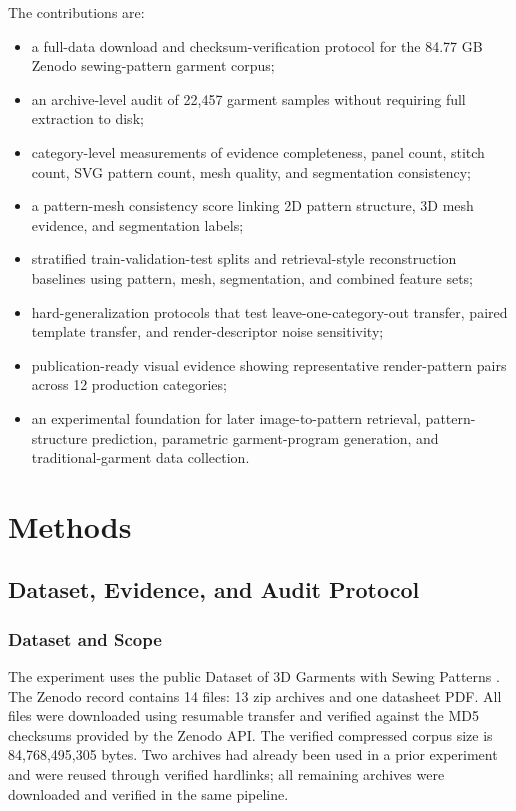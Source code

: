 \documentclass[pdflatex,sn-mathphys-num]{sn-jnl}
\begin{document}
The contributions are:
\begin{itemize}
\item a full-data download and checksum-verification protocol for the 84.77 GB Zenodo sewing-pattern garment corpus;
\item an archive-level audit of 22,457 garment samples without requiring full extraction to disk;
\item category-level measurements of evidence completeness, panel count, stitch count, SVG pattern count, mesh quality, and segmentation consistency;
\item a pattern-mesh consistency score linking 2D pattern structure, 3D mesh evidence, and segmentation labels;
\item stratified train-validation-test splits and retrieval-style reconstruction baselines using pattern, mesh, segmentation, and combined feature sets;
\item hard-generalization protocols that test leave-one-category-out transfer, paired template transfer, and render-descriptor noise sensitivity;
\item publication-ready visual evidence showing representative render-pattern pairs across 12 production categories;
\item an experimental foundation for later image-to-pattern retrieval, pattern-structure prediction, parametric garment-program generation, and traditional-garment data collection.
\end{itemize}

\section{Methods}\label{sec:methods}

\subsection{Dataset, Evidence, and Audit Protocol}

\subsubsection{Dataset and Scope}

The experiment uses the public Dataset of 3D Garments with Sewing Patterns \cite{korosteleva2021dataset}. The Zenodo record contains 14 files: 13 zip archives and one datasheet PDF. All files were downloaded using resumable transfer and verified against the MD5 checksums provided by the Zenodo API. The verified compressed corpus size is 84,768,495,305 bytes. Two archives had already been used in a prior experiment and were reused through verified hardlinks; all remaining archives were downloaded and verified in the same pipeline.
\end{document}

